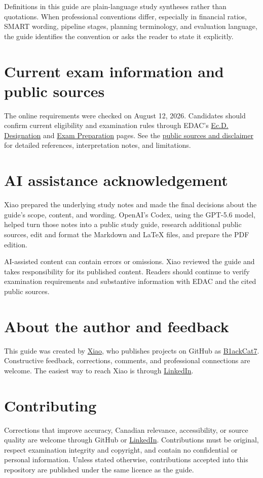 \documentclass[11pt,letterpaper,oneside,openany]{book}
\newif\ifsectionhasicon
\newcommand{\currentsectionicon}{}
\newcommand{\marginsection}[2]{%
  \begingroup
  \sectionhasicontrue
  \def\currentsectionicon{#1}%
  \section[#2]{#2}%
  \endgroup
}
\begin{document}
Definitions in this guide are plain-language study syntheses rather than quotations. When professional conventions differ, especially in financial ratios, SMART wording, pipeline stages, planning terminology, and evaluation language, the guide identifies the convention or asks the reader to state it explicitly.


\marginsection{info}{Current exam information and public sources}
The online requirements were checked on August 12, 2026. Candidates should confirm current eligibility and examination rules through EDAC's \href{https://edac.ca/professional-development/ecd-designation/}{Ec.D. Designation} and \href{https://exam.edac.ca/exam-prep/}{Exam Preparation} pages. See the \hyperref[chap:sources]{public sources and disclaimer} for detailed references, interpretation notes, and limitations.


\marginsection{sparkles}{AI assistance acknowledgement}
Xiao prepared the underlying study notes and made the final decisions about the guide's scope, content, and wording. OpenAI's Codex, using the GPT-5.6 model, helped turn those notes into a public study guide, research additional public sources, edit and format the Markdown and LaTeX files, and prepare the PDF edition.


AI-assisted content can contain errors or omissions. Xiao reviewed the guide and takes responsibility for its published content. Readers should continue to verify examination requirements and substantive information with EDAC and the cited public sources.


\marginsection{user-round}{About the author and feedback}
This guide was created by \href{https://www.linkedin.com/in/xxiao27/}{Xiao}, who publishes projects on GitHub as \href{https://github.com/B1ackCat7}{B1ackCat7}. Constructive feedback, corrections, comments, and professional connections are welcome. The easiest way to reach Xiao is through \href{https://www.linkedin.com/in/xxiao27/}{LinkedIn}.


\section[Contributing]{Contributing}
Corrections that improve accuracy, Canadian relevance, accessibility, or source quality are welcome through GitHub or \href{https://www.linkedin.com/in/xxiao27/}{LinkedIn}. Contributions must be original, respect examination integrity and copyright, and contain no confidential or personal information. Unless stated otherwise, contributions accepted into this repository are published under the same licence as the guide.
\end{document}
